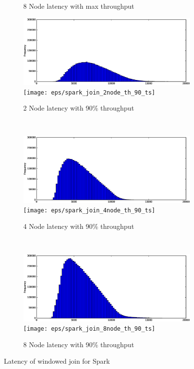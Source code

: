 \begin{figure}
\begin{subfigure}[b]{0.3\textwidth}
        \caption{8 Node latency with max throughput }
    \end{subfigure}




    \begin{subfigure}[b]{0.3\textwidth}
        \includegraphics[width=\textwidth]{eps/spark_join_2node_th_90_hist}
         \texttt{[image: eps/spark\_join\_2node\_th\_90\_ts]}

        \caption{2 Node latency with 90\% throughput }
    \end{subfigure}
    ~ 
    \begin{subfigure}[b]{0.3\textwidth}
        \includegraphics[width=\textwidth]{eps/spark_join_4node_th_90_hist}
         \texttt{[image: eps/spark\_join\_4node\_th\_90\_ts]}

        \caption{4 Node latency with 90\% throughput }
    \end{subfigure}
    ~ 
    \begin{subfigure}[b]{0.3\textwidth}
        \includegraphics[width=\textwidth]{eps/spark_join_8node_th_90_hist}
         \texttt{[image: eps/spark\_join\_8node\_th\_90\_ts]}

        \caption{8 Node latency with 90\% throughput }
    \end{subfigure}



        \caption{Latency of windowed join for Spark}
\end{figure}